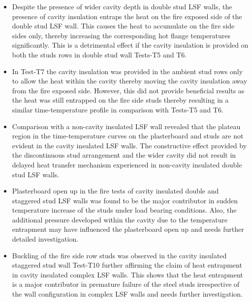 \begin{itemize}
	\item Despite the presence of wider cavity depth in double stud LSF walls, the presence of cavity insulation entraps the heat on the fire exposed side of the double stud LSF wall. This causes the heat to accumulate on the fire side sides only, thereby increasing the corresponding hot flange temperatures significantly. This is a detrimental effect if the cavity insulation is provided on both the studs rows in double stud wall Tests-T5 and T6.
	\item In Test-T7 the cavity insulation was provided in the ambient stud rows only to allow the heat within the cavity thereby moving the cavity insulation away from the fire exposed side. However, this did not provide beneficial results as the heat was still entrapped on the fire side studs thereby resulting in a similar time-temperature profile in comparison with Tests-T5 and T6. 
	\item Comparison with a non-cavity insulated LSF wall revealed that the plateau region in the time-temperature curves on the plasterboard and studs are not evident in the cavity insulated LSF walls. The constructive effect provided by the discontinuous stud arrangement and the wider cavity did not result in delayed heat transfer mechanism experienced in non-cavity insulated double stud LSF walls.
	\item Plasterboard open up in the fire tests of cavity insulated double and staggered stud LSF walls was found to be the major contributor in sudden temperature increase of the studs under load bearing conditions. Also, the additional pressure developed within the cavity due to the temperature entrapment may have influenced the plasterboard open up and needs further detailed investigation. 
	\item Buckling of the fire side row studs was observed in the cavity insulated staggered stud wall Test-T10 further affirming the claim of heat entrapment in cavity insulated complex LSF walls. This shows that the heat entrapment is a major contributor in premature failure of the steel studs irrespective of the wall configuration in complex LSF walls and needs further investigation.
\end{itemize}

